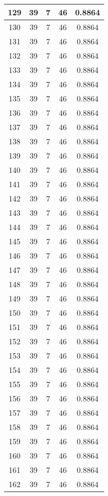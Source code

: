 \documentclass[letterpaper, 12pt]{article}
\begin{document}
\begin{longtable}{|c|c|c|c|c|}
\hline
129 & 39 & 7 & 46 & 0.8864 \\
\hline
130 & 39 & 7 & 46 & 0.8864 \\
\hline
131 & 39 & 7 & 46 & 0.8864 \\
\hline
132 & 39 & 7 & 46 & 0.8864 \\
\hline
133 & 39 & 7 & 46 & 0.8864 \\
\hline
134 & 39 & 7 & 46 & 0.8864 \\
\hline
135 & 39 & 7 & 46 & 0.8864 \\
\hline
136 & 39 & 7 & 46 & 0.8864 \\
\hline
137 & 39 & 7 & 46 & 0.8864 \\
\hline
138 & 39 & 7 & 46 & 0.8864 \\
\hline
139 & 39 & 7 & 46 & 0.8864 \\
\hline
140 & 39 & 7 & 46 & 0.8864 \\
\hline
141 & 39 & 7 & 46 & 0.8864 \\
\hline
142 & 39 & 7 & 46 & 0.8864 \\
\hline
143 & 39 & 7 & 46 & 0.8864 \\
\hline
144 & 39 & 7 & 46 & 0.8864 \\
\hline
145 & 39 & 7 & 46 & 0.8864 \\
\hline
146 & 39 & 7 & 46 & 0.8864 \\
\hline
147 & 39 & 7 & 46 & 0.8864 \\
\hline
148 & 39 & 7 & 46 & 0.8864 \\
\hline
149 & 39 & 7 & 46 & 0.8864 \\
\hline
150 & 39 & 7 & 46 & 0.8864 \\
\hline
151 & 39 & 7 & 46 & 0.8864 \\
\hline
152 & 39 & 7 & 46 & 0.8864 \\
\hline
153 & 39 & 7 & 46 & 0.8864 \\
\hline
154 & 39 & 7 & 46 & 0.8864 \\
\hline
155 & 39 & 7 & 46 & 0.8864 \\
\hline
156 & 39 & 7 & 46 & 0.8864 \\
\hline
157 & 39 & 7 & 46 & 0.8864 \\
\hline
158 & 39 & 7 & 46 & 0.8864 \\
\hline
159 & 39 & 7 & 46 & 0.8864 \\
\hline
160 & 39 & 7 & 46 & 0.8864 \\
\hline
161 & 39 & 7 & 46 & 0.8864 \\
\hline
162 & 39 & 7 & 46 & 0.8864 \\

\end{longtable}
\end{document}
